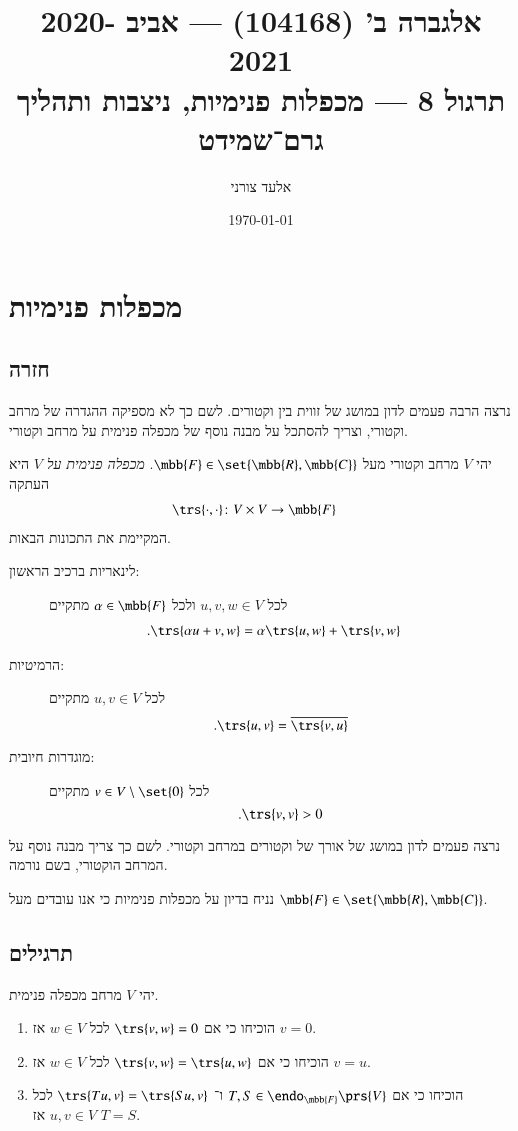 \documentclass[a4paper,10pt,oneside,openany]{article}
\title{
אלגברה ב' (104168) \textenglish{---} אביב 2020-2021
\\
תרגול 8 \textenglish{---} מכפלות פנימיות, ניצבות ותהליך גרם־שמידט
}
\author{אלעד צורני}
\date{\today}
\begin{document}
\maketitle

\section{מכפלות פנימיות}

\subsection{חזרה}

נרצה הרבה פעמים לדון במושג של זווית בין וקטורים. לשם כך לא מספיקה ההגדרה של מרחב וקטורי, וצריך להסתכל על מבנה נוסף של מכפלה פנימית על מרחב וקטורי.

\begin{definition}
יהי
$V$
מרחב וקטורי מעל
$\mbb{F} \in \set{\mbb{R}, \mbb{C}}$.
\emph{מכפלה פנימית על
$V$}
היא העתקה
\begin{align*}
\trs{\cdot,\cdot} \colon V \times V &\to \mbb{F}
\end{align*}
המקיימת את התכונות הבאות.
\begin{description}
\item[לינאריות ברכיב הראשון:]
לכל
$u,v,w \in V$
ולכל
$\alpha \in \mbb{F}$
מתקיים
\begin{align*}
\text{.} \trs{\alpha u + v, w} &= \alpha\trs{u,w} + \trs{v,w}
\end{align*}
\item[הרמיטיות:]
לכל
$u,v \in V$
מתקיים
\[\text{.} \trs{u,v} = \overline{\trs{v,u}}\]
\item[מוגדרות חיובית:]
לכל
$v \in V \setminus \set{0}$
מתקיים
\[\text{.} \trs{v,v} > 0\]
\end{description}
\end{definition}

נרצה פעמים לדון במושג של אורך של וקטורים במרחב וקטורי. לשם כך צריך מבנה נוסף על המרחב הוקטורי, בשם נורמה.

נניח בדיון על מכפלות פנימיות כי אנו עובדים מעל
$\mbb{F} \in \set{\mbb{R}, \mbb{C}}$.

\subsection{תרגילים}

\begin{exercise}
יהי
$V$
מרחב מכפלה פנימית.
\begin{enumerate}
\item הוכיחו כי אם
$\trs{v,w} = 0$
לכל
$w \in V$
אז
$v = 0$.
\item הוכיחו כי אם
$\trs{v,w} = \trs{u,w}$
לכל
$w \in V$
אז
$v=u$.
\item הוכיחו כי אם
$T,S \in \endo_{\mbb{F}}\prs{V}$
ו־%
$\trs{Tu,v} = \trs{Su,v}$
לכל
$u,v \in V$
אז
$T = S$.
\end{enumerate}
\end{exercise}
\end{document}
